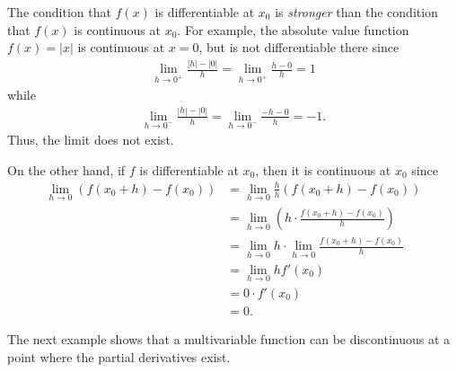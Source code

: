 \documentclass[12pt,letterpaper,reqno]{article}
\numberwithin{equation}{section}
\begin{document}
{The condition that $f(x)$ is differentiable at $x_0$ is \emph{stronger} than the condition that $f(x)$ is continuous at $x_0$. For example, the absolute value function $f(x)=|x|$ is continuous at $x=0$, but is not differentiable there since 
\begin{align*}
	\lim_{h \to 0^+}\frac{|h|-|0|}{h}=\lim_{h \to 0^+}\frac{h-0}{h}=1
\end{align*}
while
\begin{align*}
	\lim_{h \to 0^-}\frac{|h|-|0|}{h}=\lim_{h \to 0^-}\frac{-h-0}{h}=-1.
\end{align*}
Thus, the limit does not exist.

On the other hand, if $f$ is differentiable at $x_0$, then it is continuous at $x_0$ since 
\begin{align*}
	\lim_{h \to 0}(f(x_0+h)-f(x_0))&=\lim_{h \to 0}\frac{h}{h}(f(x_0+h)-f(x_0)) \\
	&=\lim_{h \to 0}\left(h \cdot \frac{f(x_0+h)-f(x_0)}{h}\right) \\
	&=\lim_{h \to 0}h \cdot \lim_{h \to 0}\frac{f(x_0+h)-f(x_0)}{h} \\
	&=\lim_{h \to 0}h f'(x_0) \\
	&=0 \cdot f'(x_0) \\
	&=0.
\end{align*}

The next example shows that a multivariable function can be discontinuous at a point where the partial derivatives exist.

}
\end{document}
